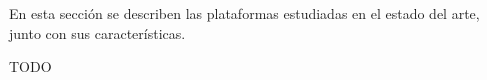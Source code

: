 

En esta sección se describen las plataformas estudiadas en el estado del arte,
junto con sus características.

TODO
